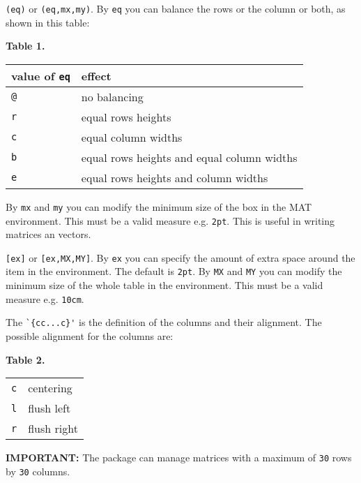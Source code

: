 \documentclass[a4paper,final,11pt]{article}
\begin{document}
\begin{dotlist}
  \item 
  \verb|(eq)| or \verb|(eq,mx,my)|.  By \verb|eq| you can balance
  the rows or the column or both, as shown in this table:
  \begin{center}
    \textbf{Table 1.} \\[1em]
    \begin{tabular}{|l|l|}
      \hline
      value of \verb|eq| & effect \\
      \hline
      \verb+@+ & no balancing \\
      \verb+r+ & equal rows heights \\
      \verb+c+ & equal column widths  \\
      \verb+b+ & equal rows heights and equal column widths \\
      \verb+e+ & equal rows heights and column widths \\
      \hline
    \end{tabular}
  \end{center}
  By \verb|mx| and \verb|my| you can modify the minimum size of the
  box in the MAT environment.  This must be a valid measure e.g.
  \verb|2pt|.  This is useful in writing matrices an vectors.
  \item
  \verb|[ex]| or \verb|[ex,MX,MY]|.  By \verb|ex| you can
  specify the amount of extra space around the item in the
   environment.  The default is \verb|2pt|.  By
  \verb|MX| and \verb|MY| you can modify the minimum size of the
  whole table in the  environment.  This must be a
  valid measure e.g. \verb|10cm|.
  \item 
  The \verb|`{cc...c}'| is the definition of the columns and their
  alignment.  The possible alignment for the columns are:
  \begin{center}
    \textbf{Table 2.} \\[1em]
    \begin{tabular}{|l|l|}
      \hline
      \verb|c| & centering \\
      \verb|l| & flush left \\
      \verb|r| & flush right \\
      \hline
    \end{tabular}
  \end{center}
\end{dotlist}
%
\textbf{IMPORTANT:} The package can manage matrices with a maximum 
of \verb|30| rows by \verb|30| columns.
\end{document}
